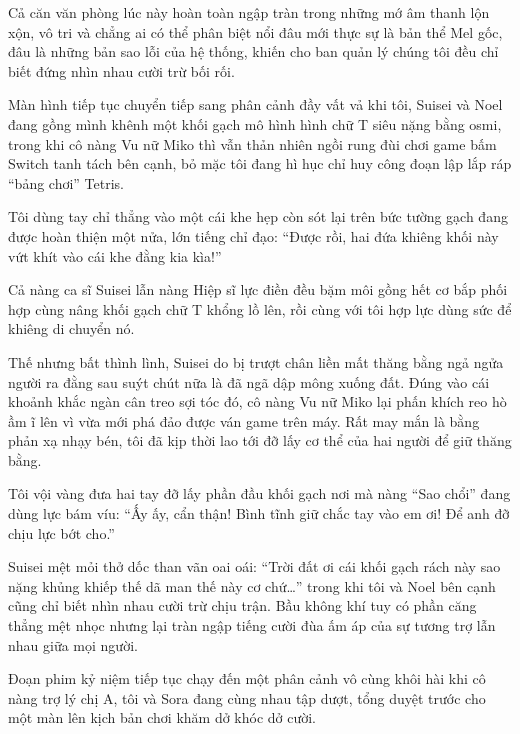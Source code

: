 \documentclass[../main.tex]{subfiles}
\begin{document}
Cả căn văn phòng lúc này hoàn toàn ngập tràn trong những mớ âm thanh lộn xộn, vô tri và chẳng ai có thể phân biệt nổi đâu mới thực sự là bản thể Mel gốc, đâu là những bản sao lỗi của hệ thống, khiến cho ban quản lý chúng tôi đều chỉ biết đứng nhìn nhau cười trừ bối rối.


\il


Màn hình tiếp tục chuyển tiếp sang phân cảnh đầy vất vả khi tôi, Suisei và Noel đang gồng mình khênh một khối gạch mô hình hình chữ T siêu nặng bằng osmi, trong khi cô nàng Vu nữ Miko thì vẫn thản nhiên ngồi rung đùi chơi game bấm Switch tanh tách bên cạnh, bỏ mặc tôi đang hì hục chỉ huy công đoạn lập lắp ráp ``bảng chơi'' Tetris.

Tôi dùng tay chỉ thẳng vào một cái khe hẹp còn sót lại trên bức tường gạch đang được hoàn thiện một nửa, lớn tiếng chỉ đạo: ``Được rồi, hai đứa khiêng khối này vứt khít vào cái khe đằng kia kìa!''

Cả nàng ca sĩ Suisei lẫn nàng Hiệp sĩ lực điền đều bặm môi gồng hết cơ bắp phối hợp cùng nâng khối gạch chữ T khổng lồ lên, rồi cùng với tôi hợp lực dùng sức để khiêng di chuyển nó.

Thế nhưng bất thình lình, Suisei do bị trượt chân liền mất thăng bằng ngả ngửa người ra đằng sau suýt chút nữa là đã ngã dập mông xuống đất. Đúng vào cái khoảnh khắc ngàn cân treo sợi tóc đó, cô nàng Vu nữ Miko lại phấn khích reo hò ầm ĩ lên vì vừa mới phá đảo được ván game trên máy. Rất may mắn là bằng phản xạ nhạy bén, tôi đã kịp thời lao tới đỡ lấy cơ thể của hai người để giữ thăng bằng.

Tôi vội vàng đưa hai tay đỡ lấy phần đầu khối gạch nơi mà nàng ``Sao chổi'' đang dùng lực bám víu: ``Ấy ấy, cẩn thận! Bình tĩnh giữ chắc tay vào em ơi! Để anh đỡ chịu lực bớt cho.''

Suisei mệt mỏi thở dốc than vãn oai oái: ``Trời đất ơi cái khối gạch rách này sao nặng khủng khiếp thế dã man thế này cơ chứ\dots'' trong khi tôi và Noel bên cạnh cũng chỉ biết nhìn nhau cười trừ chịu trận. Bầu không khí tuy có phần căng thẳng mệt nhọc nhưng lại tràn ngập tiếng cười đùa ấm áp của sự tương trợ lẫn nhau giữa mọi người.


\il


Đoạn phim kỷ niệm tiếp tục chạy đến một phân cảnh vô cùng khôi hài khi cô nàng trợ lý chị A, tôi và Sora đang cùng nhau tập dượt, tổng duyệt trước cho một màn lên kịch bản chơi khăm dở khóc dở cười.
\end{document}

